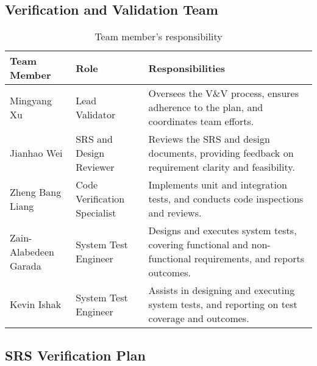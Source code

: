 \documentclass[12pt, titlepage]{article}
\begin{document}
\subsection{Verification and Validation Team}

\begin{table}[H]
\centering
\small %
\begin{tabularx}{\textwidth}{|l|l|X|}
\hline
\textbf{Team Member} & \textbf{Role} & \textbf{Responsibilities} \\ \hline
Mingyang Xu & Lead Validator & Oversees the V\&V process, ensures adherence to the plan, and coordinates team efforts. \\ \hline
Jianhao Wei & SRS and Design Reviewer & Reviews the SRS and design documents, providing feedback on requirement clarity and feasibility. \\ \hline
Zheng Bang Liang & Code Verification Specialist & Implements unit and integration tests, and conducts code inspections and reviews. \\ \hline
Zain-Alabedeen Garada & System Test Engineer & Designs and executes system tests, covering functional and non-functional requirements, and reports outcomes. \\ \hline
Kevin Ishak & System Test Engineer & Assists in designing and executing system tests, and reporting on test coverage and outcomes. \\ \hline
\end{tabularx}
\caption{Team member's responsibility}
\end{table}

\FloatBarrier %


\subsection{SRS Verification Plan}
\end{document}
